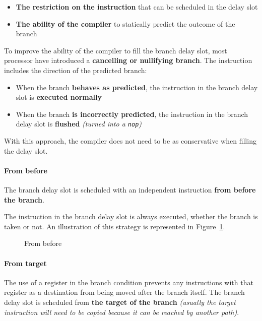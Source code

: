 \documentclass[english]{article}
\begin{document}
\begin{itemize}
  \item \textbf{The restriction on the instruction} that can be scheduled in the delay slot
  \item \textbf{The ability of the compiler} to statically predict the outcome of the branch
\end{itemize}

To improve the ability of the compiler to fill the branch delay slot, most processor have introduced a \textbf{cancelling or nullifying branch}.
The instruction includes the direction of the predicted branch:

\begin{itemize}
  \item When the branch \textbf{behaves as predicted}, the instruction in the branch delay slot is \textbf{executed normally}
  \item When the branch \textbf{is incorrectly predicted}, the instruction in the branch delay slot is \textbf{flushed} \textit{(turned into a \texttt{nop})}
\end{itemize}

With this approach, the compiler does not need to be as conservative when filling the delay slot.

\paragraph{From before}

The branch delay slot is scheduled with an independent instruction \textbf{from before the branch}.

The instruction in the branch delay slot is always executed, whether the branch is taken or not.
An illustration of this strategy is represented in Figure~\ref{fig:from-before}.

\begin{figure}[htbp]
  \bigskip
  \centering
  \caption{From before}
  \label{fig:from-before}
  \bigskip
\end{figure}

\paragraph{From target}

The use of a register in the branch condition prevents any instructions with that register as a destination from being moved after the branch itself.
The branch delay slot is scheduled from \textbf{the target of the branch} \textit{(usually the target instruction will need to be copied because it can be reached by another path)}.
\end{document}

